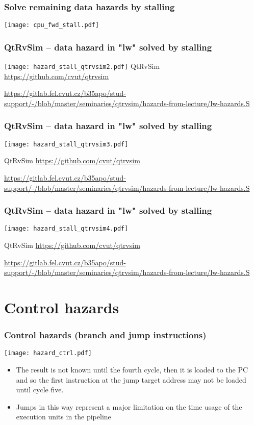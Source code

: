 \documentclass{beamer}
\begin{document}
\begin{frame}
\frametitle{Solve remaining data hazards by stalling}
\texttt{[image: cpu\_fwd\_stall.pdf]}
\end{frame}

\begin{frame}
\frametitle{QtRvSim -- data hazard in "lw" solved by stalling}
\texttt{[image: hazard\_stall\_qtrvsim2.pdf]}
{\tiny
QtRvSim \url{https://github.com/cvut/qtrvsim}
}

{\Tiny
\url{https://gitlab.fel.cvut.cz/b35apo/stud-support/-/blob/master/seminaries/qtrvsim/hazards-from-lecture/lw-hazards.S}
}

\end{frame}

\begin{frame}
\frametitle{QtRvSim -- data hazard in "lw" solved by stalling}
\texttt{[image: hazard\_stall\_qtrvsim3.pdf]}

{\tiny
QtRvSim \url{https://github.com/cvut/qtrvsim}
}

{\Tiny
\url{https://gitlab.fel.cvut.cz/b35apo/stud-support/-/blob/master/seminaries/qtrvsim/hazards-from-lecture/lw-hazards.S}
}

\end{frame}

\begin{frame}
\frametitle{QtRvSim -- data hazard in "lw" solved by stalling}
\texttt{[image: hazard\_stall\_qtrvsim4.pdf]}

{\tiny
QtRvSim \url{https://github.com/cvut/qtrvsim}
}

{\Tiny
\url{https://gitlab.fel.cvut.cz/b35apo/stud-support/-/blob/master/seminaries/qtrvsim/hazards-from-lecture/lw-hazards.S}
}

\end{frame}

\section{Control hazards}

\begin{frame}
\frametitle{Control hazards (branch and jump instructions)}
\texttt{[image: hazard\_ctrl.pdf]}

\begin{itemize}
 \item The result is not known until the fourth cycle, then it is loaded to the PC
       and so the first instruction at the jump target address may not be loaded until cycle five.
 \item Jumps in this way represent a major limitation on the time usage of the execution units in the pipeline
\end{itemize}

\end{frame}
\end{document}

